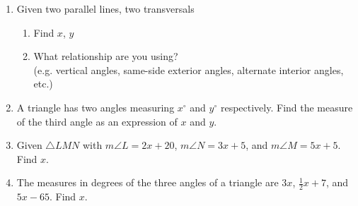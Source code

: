 \documentclass[12pt, twoside]{article}
\begin{document}
\begin{enumerate}
\item Given two parallel lines, two transversals
\begin{multicols}{2}
  \begin{enumerate}
    \item Find $x$, $y$
    \item What relationship are you using? \\[0.5cm]
    (e.g. vertical angles, same-side exterior angles, alternate interior angles, etc.)
  \end{enumerate}
\end{multicols}

\item A triangle has two angles measuring $x^\circ$ and $y^\circ$ respectively. Find the measure of the third angle as an expression of $x$ and $y$. \vspace{2cm}

\newpage
\item Given  $\triangle LMN$ with $m\angle L=2x+20$, $m\angle N=3x+5$, and $m\angle M=5x+5$. Find $x$.
  \begin{flushright}
  \end{flushright} \vspace{2cm}

\item The measures in degrees of the three angles of a triangle are $3x$, $\frac{1}{2}x+7$, and $5x-65$. Find $x$. \vspace{4cm}


\end{enumerate}
\end{document}
